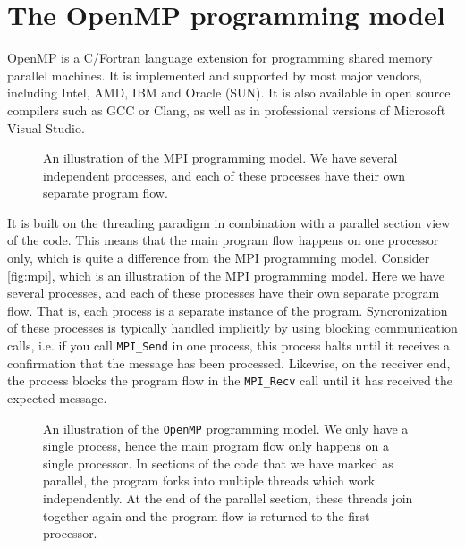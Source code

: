 \section{The OpenMP programming model}

OpenMP is a C/Fortran language extension for programming shared memory parallel
machines. It is implemented and supported by most major vendors, including
Intel, AMD, IBM and Oracle (SUN). It is also available in open source compilers
such as GCC or Clang, as well as in professional versions of Microsoft Visual
Studio.

\begin{figure}
  \centering
  
  \caption{
    An illustration of the MPI programming model. We have several independent
    processes, and each of these processes have their own separate program
    flow.
  }
  \label{fig:mpi}
\end{figure}

It is built on the threading paradigm in combination with a parallel section
view of the code. This means that the main program flow happens on one processor
only, which is quite a difference from the MPI programming model. Consider
\autoref{fig:mpi}, which is an illustration of the MPI programming model. Here
we have several processes, and each of these processes have their own separate
program flow. That is, each process is a separate instance of the program.
Syncronization of these processes is typically handled implicitly by using
blocking communication calls, i.e. if you call \texttt{MPI\_Send} in one
process, this process halts until it receives a confirmation that the message
has been processed. Likewise, on the receiver end, the process blocks the
program flow in the \texttt{MPI\_Recv} call until it has received the expected
message.

\begin{figure}
  \centering
  
  \caption{
    An illustration of the \texttt{OpenMP} programming model. We only have a
    single process, hence the main program flow only happens on a single
    processor. In sections of the code that we have marked as parallel, the
    program forks into multiple threads which work independently. At the end of
    the parallel section, these threads join together again and the program flow
    is returned to the first processor.
  }
  \label{fig:openmp}
\end{figure}


